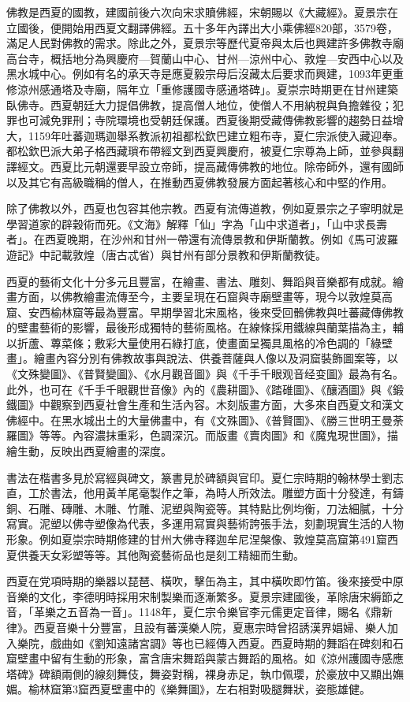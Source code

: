 佛教是西夏的國教，建國前後六次向宋求贖佛經，宋朝賜以《大藏經》。夏景宗在立國後，便開始用西夏文翻譯佛經。五十多年內譯出大小乘佛經820部，3579卷，滿足人民對佛教的需求。除此之外，夏景宗等歷代夏帝與太后也興建許多佛教寺廟高台寺，概括地分為興慶府—賀蘭山中心、甘州—涼州中心、敦煌—安西中心以及黑水城中心。例如有名的承天寺是應夏毅宗母后沒藏太后要求而興建，1093年更重修涼州感通塔及寺廟，隔年立「重修護國寺感通塔碑」。夏崇宗時期更在甘州建築臥佛寺。西夏朝廷大力提倡佛教，提高僧人地位，使僧人不用納稅與負擔雜役；犯罪也可減免罪刑；寺院環境也受朝廷保護。西夏後期受藏傳佛教影響的趨勢日益增大，1159年吐蕃迦瑪迦舉系教派初祖都松欽巴建立粗布寺，夏仁宗派使入藏迎奉。都松欽巴派大弟子格西藏瑣布帶經文到西夏興慶府，被夏仁宗尊為上師，並參與翻譯經文。西夏比元朝還要早設立帝師，提高藏傳佛教的地位。除帝師外，還有國師以及其它有高級職稱的僧人，在推動西夏佛教發展方面起著核心和中堅的作用。

除了佛教以外，西夏也包容其他宗教。西夏有流傳道教，例如夏景宗之子寧明就是學習道家的辟穀術而死。《文海》解釋「仙」字為「山中求道者」，「山中求長壽者」。在西夏晚期，在沙州和甘州一帶還有流傳景教和伊斯蘭教。例如《馬可波羅遊記》中記載敦煌（唐古忒省）與甘州有部分景教和伊斯蘭教徒。

西夏的藝術文化十分多元且豐富，在繪畫、書法、雕刻、舞蹈與音樂都有成就。繪畫方面，以佛教繪畫流傳至今，主要呈現在石窟與寺廟壁畫等，現今以敦煌莫高窟、安西榆林窟等最為豐富。早期學習北宋風格，後來受回鶻佛教與吐蕃藏傳佛教的壁畫藝術的影響，最後形成獨特的藝術風格。在線條採用鐵線與蘭葉描為主，輔以折蘆、蓴菜條；敷彩大量使用石綠打底，使畫面呈獨具風格的冷色調的「綠壁畫」。繪畫內容分別有佛教故事與說法、供養菩薩與人像以及洞窟裝飾圖案等，以《文殊變圖》、《普賢變圖》、《水月觀音圖》與《千手千眼观音经变圖》最為有名。此外，也可在《千手千眼觀世音像》內的《農耕圖》、《踏碓圖》、《釀酒圖》與《鍛鐵圖》中觀察到西夏社會生產和生活內容。木刻版畫方面，大多來自西夏文和漢文佛經中。在黑水城出土的大量佛畫中，有《文殊圖》、《普賢圖》、《勝三世明王曼荼羅圖》等等。內容濃抹重彩，色調深沉。而版畫《賣肉圖》和《魔鬼現世圖》，描繪生動，反映出西夏繪畫的深度。

書法在楷書多見於寫經與碑文，篆書見於碑額與官印。夏仁宗時期的翰林學士劉志直，工於書法，他用黃羊尾毫製作之筆，為時人所效法。雕塑方面十分發達，有鑄銅、石雕、磚雕、木雕、竹雕、泥塑與陶瓷等。其特點比例均衡，刀法細膩，十分寫實。泥塑以佛寺塑像為代表，多運用寫實與藝術誇張手法，刻劃現實生活的人物形象。例如夏崇宗時期修建的甘州大佛寺釋迦牟尼涅槃像、敦煌莫高窟第491窟西夏供養天女彩塑等等。其他陶瓷藝術品也是刻工精細而生動。

西夏在党項時期的樂器以琵琶、橫吹，擊缶為主，其中橫吹即竹笛。後來接受中原音樂的文化，李德明時採用宋制製樂而逐漸繁多。夏景宗建國後，革除唐宋縟節之音，「革樂之五音為一音」。1148年，夏仁宗令樂官李元儒更定音律，賜名《鼎新律》。西夏音樂十分豐富，且設有蕃漢樂人院，夏惠宗時曾招誘漢界娼婦、樂人加入樂院，戲曲如《劉知遠諸宮調》等也已經傳入西夏。西夏時期的舞蹈在碑刻和石窟壁畫中留有生動的形象，富含唐宋舞蹈與蒙古舞蹈的風格。如《涼州護國寺感應塔碑》碑額兩側的線刻舞伎，舞姿對稱，裸身赤足，執巾佩瓔，於豪放中又顯出嫵媚。榆林窟第3窟西夏壁畫中的《樂舞圖》，左右相對吸腿舞狀，姿態雄健。

